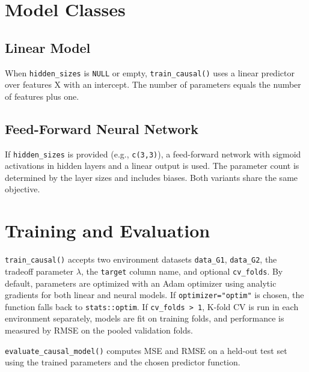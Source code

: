 \documentclass[11pt,a4paper]{article}
\begin{document}
\section{Model Classes}
\subsection{Linear Model}
When \texttt{hidden\_sizes} is \texttt{NULL} or empty, \texttt{train\_causal()} uses a linear predictor over features X with an intercept. The number of parameters equals the number of features plus one.

\subsection{Feed-Forward Neural Network}
If \texttt{hidden\_sizes} is provided (e.g., \texttt{c(3,3)}), a feed-forward network with sigmoid activations in hidden layers and a linear output is used. The parameter count is determined by the layer sizes and includes biases. Both variants share the same objective.

\section{Training and Evaluation}
\texttt{train\_causal()} accepts two environment datasets \texttt{data\_G1}, \texttt{data\_G2}, the tradeoff parameter \(\lambda\), the \texttt{target} column name, and optional \texttt{cv\_folds}. By default, parameters are optimized with an Adam optimizer using analytic gradients for both linear and neural models. If \texttt{optimizer="optim"} is chosen, the function falls back to \texttt{stats::optim}. If \texttt{cv\_folds > 1}, K-fold CV is run in each environment separately, models are fit on training folds, and performance is measured by RMSE on the pooled validation folds.

\texttt{evaluate\_causal\_model()} computes MSE and RMSE on a held-out test set using the trained parameters and the chosen predictor function.
\end{document}

